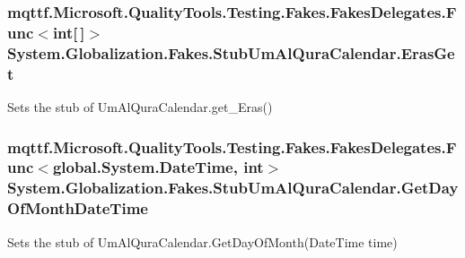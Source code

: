 \hypertarget{class_system_1_1_globalization_1_1_fakes_1_1_stub_um_al_qura_calendar_a0d0c69c9a22c7921e607cc45d9e95cb9}{
\subsubsection[{Eras\-Get}]{\setlength{\rightskip}{0pt plus 5cm}mqttf.\-Microsoft.\-Quality\-Tools.\-Testing.\-Fakes.\-Fakes\-Delegates.\-Func$<$int\mbox{[}$\,$\mbox{]}$>$ System.\-Globalization.\-Fakes.\-Stub\-Um\-Al\-Qura\-Calendar.\-Eras\-Get}}\label{class_system_1_1_globalization_1_1_fakes_1_1_stub_um_al_qura_calendar_a0d0c69c9a22c7921e607cc45d9e95cb9}


Sets the stub of Um\-Al\-Qura\-Calendar.\-get\-\_\-\-Eras()

\hypertarget{class_system_1_1_globalization_1_1_fakes_1_1_stub_um_al_qura_calendar_a9e4de8aa01a58d7d57713df4ed8d2d14}{
\subsubsection[{Get\-Day\-Of\-Month\-Date\-Time}]{\setlength{\rightskip}{0pt plus 5cm}mqttf.\-Microsoft.\-Quality\-Tools.\-Testing.\-Fakes.\-Fakes\-Delegates.\-Func$<$global.\-System.\-Date\-Time, int$>$ System.\-Globalization.\-Fakes.\-Stub\-Um\-Al\-Qura\-Calendar.\-Get\-Day\-Of\-Month\-Date\-Time}}\label{class_system_1_1_globalization_1_1_fakes_1_1_stub_um_al_qura_calendar_a9e4de8aa01a58d7d57713df4ed8d2d14}


Sets the stub of Um\-Al\-Qura\-Calendar.\-Get\-Day\-Of\-Month(\-Date\-Time time)


